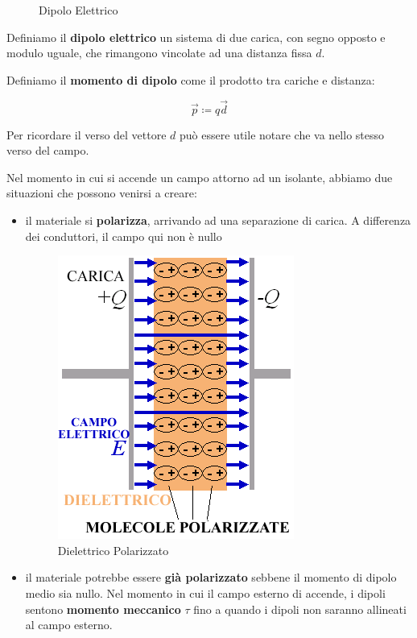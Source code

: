 \begin{figure} [ht]
	\centering
\caption{Dipolo Elettrico}
\end{figure}

Definiamo il \textbf{dipolo elettrico} un sistema di due carica, con segno opposto e modulo uguale, che rimangono vincolate ad una distanza fissa $d$. 

Definiamo il \textbf{momento di dipolo} come il prodotto tra cariche e distanza: 

\begin{large}
	\begin{equation} \label{eq_momento_dipolo}
		\vec{p} \coloneqq q\vec{d}
	\end{equation}
\end{large}

Per ricordare il verso del vettore $d$ può essere utile notare che va nello stesso verso del campo.

Nel momento in cui si accende un campo attorno ad un isolante, abbiamo due situazioni che possono venirsi a creare: 

\begin{itemize}
	\item il materiale si \textbf{polarizza}, arrivando ad una separazione di carica. A differenza dei conduttori, il campo qui non è nullo
	
	\begin{figure}[th]
		\centering
		\includegraphics[width=0.5\linewidth]{Media/polarizzazione}
		\caption{Dielettrico Polarizzato}
		\label{fig:polarizzazione}
	\end{figure}
	
	\item il materiale potrebbe essere \textbf{già polarizzato} sebbene il momento di dipolo medio sia nullo. Nel momento in cui il campo esterno di accende, i dipoli sentono \textbf{momento meccanico} $\tau$ fino a quando i dipoli non saranno allineati al campo esterno. 
\end{itemize}

